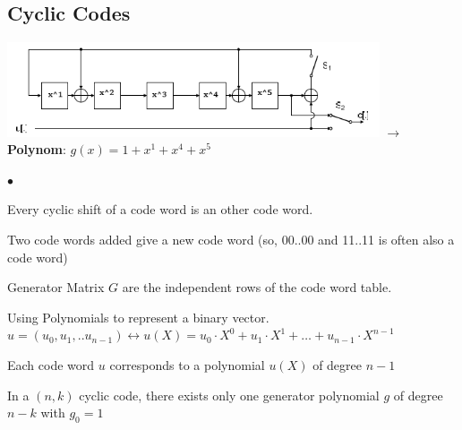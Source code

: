 \subsection{Cyclic Codes}
\includegraphics[width=11cm]{./bilder/shift_reg.png}
$\to$ \textbf{Polynom}: $g(x)=1+x^1+x^4+x^5$\\

\begin{list}{$\bullet$}{\setlength{\itemsep}{0cm} \setlength{\parsep}{0cm} \setlength{\topsep}{0.1cm}} 
\item Every cyclic shift of a code word is an other code word.
\item Two code words added give a new code word (so, 00..00 and 11..11 is often also a code word)
\item Generator Matrix $G$ are the independent rows of the code word table.
\item Using Polynomials to represent a binary vector. \\
	  $u=(u_0, u_1,..u_{n-1}) \leftrightarrow u(X)=u_0 \cdot X^0 + u_1 \cdot X^1 + \ldots + u_{n-1} \cdot X^{n-1}$
\item Each code word $u$ corresponds to a polynomial $u(X)$ of degree $n-1$
\item In a $(n,k)$ cyclic code, there exists only one generator polynomial $g$ of degree $n-k$ with $g_0=1$
\end{list}

